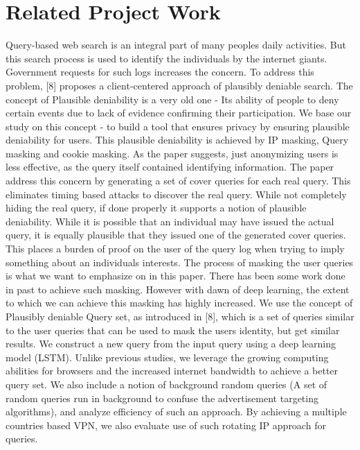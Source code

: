 \documentclass[10pt, a4paper, twocolumn]{article} %
\begin{document}
\section{Related Project Work}
Query-based web search is an integral part of many peoples daily activities. But this search process is used to identify the individuals by the internet giants. Government requests for such logs increases the concern. To address this problem, [8] proposes a client-centered approach of plausibly deniable search. The concept of Plausible deniability is a very old one - Its ability of people to deny certain events due to lack of evidence confirming their participation. We base our study on this concept - to build a tool that ensures privacy by ensuring plausible deniability for users. This plausible deniability is achieved by IP masking, Query masking and cookie masking. As the paper suggests, just anonymizing users is less effective, as the query itself contained identifying information. The paper address this concern by generating a set of cover queries for each real query. This eliminates timing based attacks to discover the real query. While not completely hiding the real query, if done properly it supports a notion of plausible deniability. While it is possible that an individual may have issued the actual query, it is equally plausible that they issued one of the generated cover queries. This places a burden of proof on the user of the query log when trying to imply something about an individuals interests. The process of masking the user queries is what we want to emphasize on in this paper. There has been some work done in past to achieve such masking. However with dawn of deep learning, the extent to which we can achieve this masking has highly increased. We use the concept of Plausibly deniable Query set, as introduced in [8], which is a set of queries similar to the user queries that can be used to mask the users identity, but get similar results. We construct a new query from the input query using a deep learning model (LSTM). Unlike previous studies, we leverage the growing computing abilities for browsers and the increased internet bandwidth to achieve a better query set. We also include a notion of background random queries (A set of random queries run in background to confuse the advertisement targeting algorithms), and analyze efficiency of such an approach. By achieving a multiple countries based VPN, we also evaluate use of such rotating IP approach for queries.\newline
\end{document}
